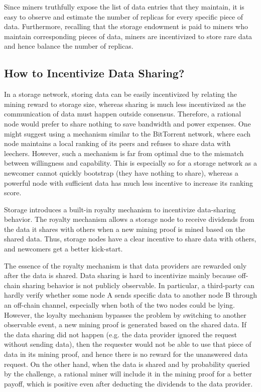 Since miners truthfully expose the list of data entries that they maintain,
it is easy to observe and estimate the number of replicas for every specific piece of data.
Furthermore, recalling that the storage endowment is paid to miners who maintain corresponding pieces of data,
miners are incentivized to store rare data and hence balance the number of replicas.





\subsection{How to Incentivize Data Sharing?}

In a storage network, storing data can be easily incentivized by relating the mining reward to storage size, whereas sharing is much less incentivized as the communication of data must happen outside consensus. 
Therefore, a rational node would prefer to share nothing to save bandwidth and power expenses.
One might suggest using a mechanism similar to the BitTorrent network, where each node maintains a local ranking of its peers and refuses to share data with leechers.
However, such a mechanism is far from optimal due to the mismatch between willingness and capability. This is especially so for a storage network as a newcomer cannot quickly bootstrap (they have nothing to share), whereas a powerful node with sufficient data has much less incentive to increase its ranking score.

\projabbrev Storage introduces a built-in royalty mechanism to incentivize data-sharing behavior.
The royalty mechanism allows a storage node to receive dividends 
from the data it shares with others 
when a new mining proof is mined based on the shared data.
Thus, storage nodes have a clear incentive to share data with others, and newcomers get a better kick-start.

The essence of the royalty mechanism is that data providers are rewarded only after the data is shared.
Data sharing is hard to incentivize mainly because off-chain sharing behavior is not publicly observable.
In particular, a third-party can hardly verify whether some node A sends specific data to another node B through an off-chain channel,
especially when both of the two nodes could be lying.
However, the \project loyalty mechanism bypasses the problem by switching to another observable event, \ie a new mining proof is generated based on the shared data.
If the data sharing did not happen (e.g. the data provider ignored the request without sending data), then the requester would not be able to use that piece of data in its mining proof, and hence there is no reward for the unanswered data request.
On the other hand, when the data is shared and by probability queried by the \sproof challenge, a rational miner will include it in the mining proof for a better payoff, which is positive even after deducting the dividends to the data provider.

